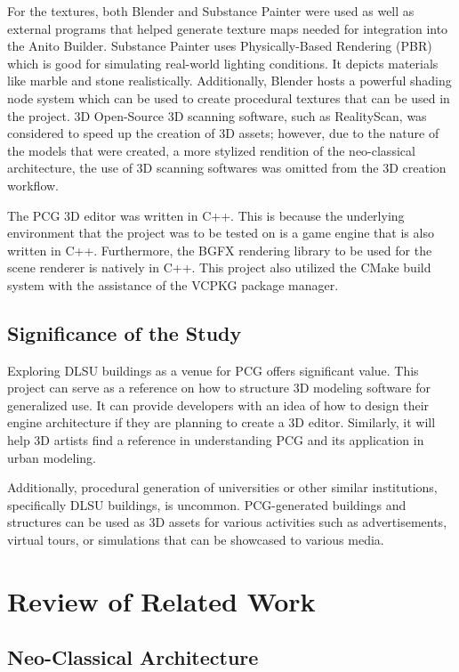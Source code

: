 \documentclass[manuscript,screen,12pt]{article}
\begin{document}
For the textures, both Blender and Substance Painter were used as well as external programs that helped generate texture maps needed for integration into the Anito Builder. Substance Painter uses Physically-Based Rendering (PBR) which is good for simulating real-world lighting conditions. It depicts materials like marble and stone realistically. Additionally, Blender hosts a powerful shading node system which can be used to create procedural textures that can be used in the project. 3D Open-Source 3D scanning software, such as RealityScan, was considered to speed up the creation of 3D assets; however, due to the nature of the models that were created, a more stylized rendition of the neo-classical architecture, the use of 3D scanning softwares was omitted from the 3D creation workflow. 

The PCG 3D editor was written in C++. This is because the underlying environment that the project was to be tested on is a game engine that is also written in C++. Furthermore, the BGFX rendering library to be used for the scene renderer is natively in C++. This project also utilized the CMake build system with the assistance of the VCPKG package manager.

\subsection{Significance of the Study}
Exploring DLSU buildings as a venue for PCG offers significant value. This project can serve as a reference on how to structure 3D modeling software for generalized use. It can provide developers with an idea of how to design their engine architecture if they are planning to create a 3D editor. Similarly, it will help 3D artists find a reference in understanding PCG and its application in urban modeling.

Additionally, procedural generation of universities or other similar institutions, specifically DLSU buildings, is uncommon. PCG-generated buildings and structures can be used as 3D assets for various activities such as advertisements, virtual tours, or simulations that can be showcased to various media.

\newpage
\section{Review of Related Work}

\subsection{Neo-Classical Architecture}
\end{document}
